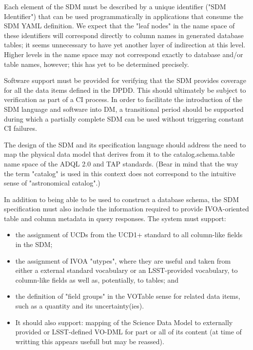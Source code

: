 Each element of the SDM must be described by a unique identifier ("SDM Identifier") that can be used programmatically in applications that consume the SDM YAML definition.  We expect that the "leaf nodes" in the name space of these identifiers will correspond directly to column names in generated database tables; it seems unnecessary to have yet another layer of indirection at this level.  Higher levels in the name space may not correspond exactly to database and/or table names, however; this has yet to be determined precisely.

Software support must be provided for verifying that the SDM provides coverage for all the data items defined in the DPDD.  This should ultimately be subject to verification as part of a CI process.  In order to facilitate the introduction of the SDM language and software into DM, a transitional period should be supported during which a partially complete SDM can be used without triggering constant CI failures.

The design of the SDM and its specification language should address the need to map the physical data model that derives from it to the catalog.schema.table name space of the ADQL 2.0 and TAP standards.  (Bear in mind that the way the term "catalog" is used in this context does not correspond to the intuitive sense of "astronomical catalog".)

In addition to being able to be used to construct a database schema, the SDM specification must also include the information required to provide IVOA-oriented table and column metadata in query responses.  The system must support:

\begin{itemize}
\item      the assignment of UCDs from the UCD1+ standard to all column-like fields in the SDM;
    \item the assignment of IVOA "utypes", where they are useful and taken from either a external standard vocabulary or an LSST-provided vocabulary, to column-like fields as well as, potentially, to tables; and
    \item the definition of "field groups" in the VOTable sense for related data items, such as a quantity and its uncertainty(ies).
\item It should also support:
    mapping of the Science Data Model to externally provided or LSST-defined VO-DML for part or all of its content (at time of writting this appears usefull but may be reassed).
\end{itemize}

